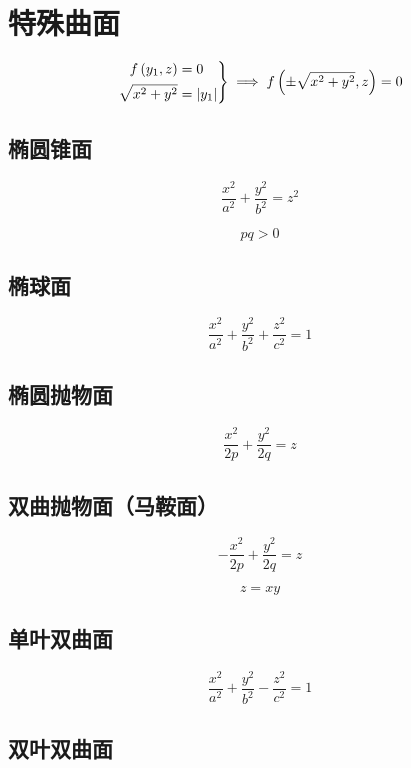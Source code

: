 \documentclass{article}
\begin{document}
\section{特殊曲面}

\begin{definition}[绕$z$轴旋转曲面：（原曲线为$f\p{y_1,z}=0$）]
    \[\left.\begin{aligned}
            f\left(y_1,z\right)     & =0         \\
            \sqrt{x^2+y^2} & =\left|y_1\right|
        \end{aligned}\right\}
        \implies
        f\left(\pm\sqrt{x^2+y^2},z\right)=0\]
\end{definition}

\subsection{椭圆锥面}

\[\frac{x^2}{a^2}+\frac{y^2}{b^2}=z^2\]

\begin{definition}[以下二次曲面方程中都有]
    \[pq>0\]
\end{definition}

\subsection{椭球面}

\[\frac{x^2}{a^2}+\frac{y^2}{b^2}+\frac{z^2}{c^2}=1\]

\subsection{椭圆抛物面}

\[\frac{x^2}{2p}+\frac{y^2}{2q}=z\]

\subsection{双曲抛物面（马鞍面）}

\[-\frac{x^2}{2p}+\frac{y^2}{2q}=z\]

\[z=xy\]

\subsection{单叶双曲面}

\[\frac{x^2}{a^2}+\frac{y^2}{b^2}-\frac{z^2}{c^2}=1\]

\subsection{双叶双曲面}
\end{document}

